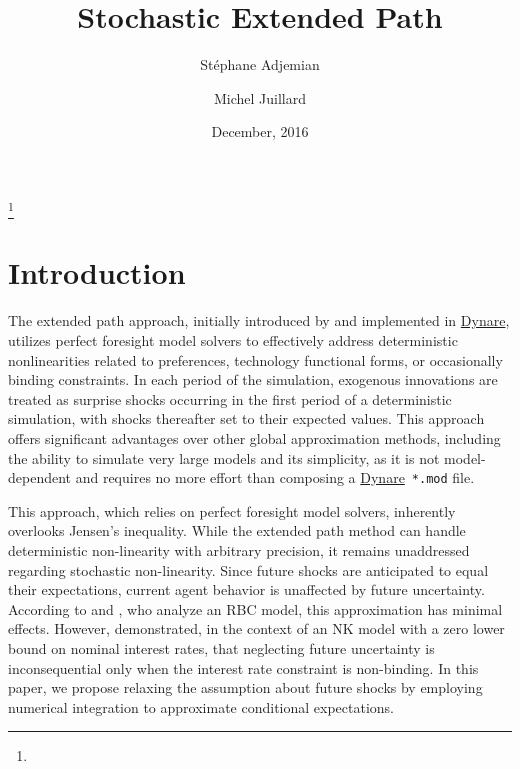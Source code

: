 \documentclass[a4paper,12pt]{amsart}
\newcommand{\Dynare}{\href{http://www.dynare.org}{Dynare}}
\begin{document}
\author[S. Adjemian]{Stéphane Adjemian}\address{Université du Mans and Dynare team}
\author[M. Juillard]{Michel Juillard}\address{Dynare team}


\title[Stochastic Extended Path]{Stochastic Extended Path}\thanks{}
\date{December, 2016}
\maketitle

\section*{Introduction}

The extended path approach, initially introduced by
\textcite{FairTaylor1983} and implemented in \Dynare, utilizes perfect
foresight model solvers to effectively address deterministic
nonlinearities related to preferences, technology functional forms, or
occasionally binding constraints. In each period of the simulation,
exogenous innovations are treated as surprise shocks occurring in the
first period of a deterministic simulation, with shocks thereafter set
to their expected values. This approach offers significant advantages
over other global approximation methods, including the ability to
simulate very large models and its simplicity, as it is not
model-dependent and requires no more effort than composing a \Dynare\,
\verb+*.mod+ file.\newline

This approach, which relies on perfect foresight model solvers,
inherently overlooks Jensen's inequality. While the extended path
method can handle deterministic non-linearity with arbitrary
precision, it remains unaddressed regarding stochastic
non-linearity. Since future shocks are anticipated to equal their
expectations, current agent behavior is unaffected by future
uncertainty. According to \textcite{Gagnon1990} and
\textcite{Love2009}, who analyze an RBC model, this approximation has
minimal effects. However, \textcite{AdjemianJuillard2011}
demonstrated, in the context of an NK model with a zero lower bound on
nominal interest rates, that neglecting future uncertainty is
inconsequential only when the interest rate constraint is
non-binding. In this paper, we propose relaxing the assumption about
future shocks by employing numerical integration to approximate
conditional expectations.\newline
\end{document}
